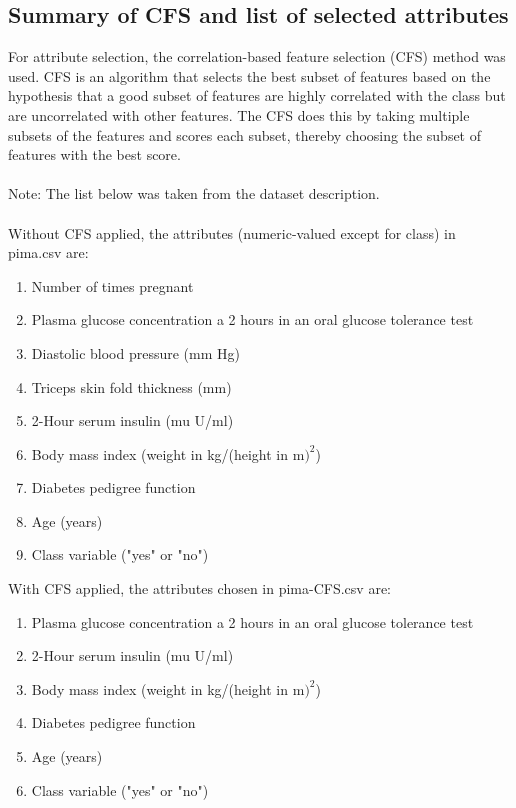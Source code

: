 \documentclass{article}
\begin{document}
     \subsection{Summary of CFS and list of selected attributes}
    For attribute selection, the correlation-based feature selection (CFS) method was used. CFS is an algorithm that selects the best subset of features based on the hypothesis that a good subset of features are highly correlated with the class but are uncorrelated with other features. The CFS does this by taking multiple subsets of the features and scores each subset, thereby choosing the subset of features with the best score.
    \\
    \\
    \newpage
    Note: The list below was taken from the dataset description.
    \\
    \\
    Without CFS applied, the attributes (numeric-valued except for class) in pima.csv are:
    \begin{enumerate}
        \item Number of times pregnant
        \item Plasma glucose concentration a 2 hours in an oral glucose tolerance test
        \item Diastolic blood pressure (mm Hg)
        \item Triceps skin fold thickness (mm)
        \item 2-Hour serum insulin (mu U/ml)
        \item Body mass index (weight in kg/(height in m$)^2$)
        \item Diabetes pedigree function
        \item Age (years)
        \item  Class variable ("yes" or "no")
    \end{enumerate}
    \vspace{0.5cm}
    With CFS applied, the attributes chosen in pima-CFS.csv are:
    \begin{enumerate}
        \item Plasma glucose concentration a 2 hours in an oral glucose tolerance test
        \item 2-Hour serum insulin (mu U/ml)
        \item Body mass index (weight in kg/(height in m$)^2$)
        \item Diabetes pedigree function
        \item Age (years)
        \item  Class variable ("yes" or "no")
    \end{enumerate}
\end{document}
